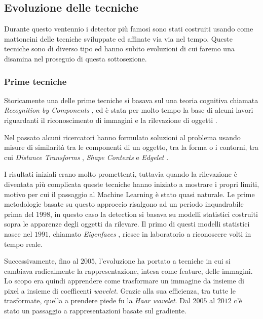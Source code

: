 \subsection{Evoluzione delle tecniche}
Durante questo ventennio i detector più famosi sono stati costruiti usando come mattoncini delle tecniche sviluppate ed affinate via via nel tempo. Queste tecniche sono di diverso tipo ed hanno subito evoluzioni di cui faremo una disamina nel proseguio di questa sottosezione.
\subsubsection{Prime tecniche}
Storicamente una delle prime tecniche si basava sul una teoria cognitiva chiamata \textit{Recognition by Components} \cite{biederman1987recognition}, ed è stata per molto tempo la base di alcuni lavori riguardanti il riconoscimento di immagini e la rilevazione di oggetti \cite{felzenszwalb2008discriminatively} \cite{fischler1973representation} \cite{leibe2008robust}.   

Nel passato alcuni ricercatori hanno formulato soluzioni al problema usando misure di similarità tra le componenti di un oggetto, tra la forma o i contorni, tra cui \textit{Distance Transforms} \cite{gavrila1999real}, \textit{Shape Contexts} \cite{belongie2002shape} e \textit{Edgelet} \cite{wu2005detection}.

I risultati iniziali erano molto promettenti, tuttavia quando la rilevazione è diventata più complicata queste tecniche hanno iniziato a mostrare i propri limiti, motivo per cui il passaggio al Machine Learning è stato quasi naturale. Le prime metodologie basate su questo approccio risalgono ad un periodo inquadrabile prima del $1998$, in questo caso la detection si basava su modelli statistici costruiti sopra le apparenze degli oggetti da rilevare. 
Il primo di questi modelli statistici nasce nel $1991$, chiamato \textit{Eigenfaces} \cite{turk1991eigenfaces} \cite{pentland1994view}, riesce in laboratorio a riconoscere volti in tempo reale.

Successivamente, fino al $2005$, l'evoluzione ha portato a tecniche in cui si cambiava radicalmente la rappresentazione, intesa come feature, delle immagini. Lo scopo era quindi apprendere come trasformare un immagine da insieme di pixel a insieme di coefficenti \textit{wavelet}. Grazie alla sua efficienza, tra tutte le trasformate, quella a prendere piede fu la \textit{Haar wavelet}. Dal $2005$ al $2012$ c'è stato un passaggio a rappresentazioni basate sul gradiente. 

